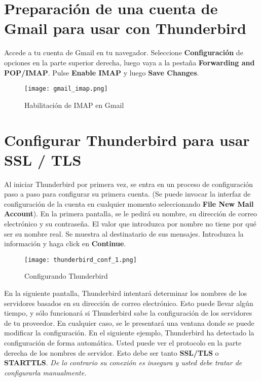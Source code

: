 \documentclass[10pt,a5paper,twoside,,]{book}
\begin{document}
\section{Preparación de una cuenta de Gmail para usar con
Thunderbird}\label{preparaciuxf3n-de-una-cuenta-de-gmail-para-usar-con-thunderbird}

Accede a tu cuenta de Gmail en tu navegador. Seleccione
\textbf{Configuración} de opciones en la parte superior derecha, luego
vaya a la pestaña \textbf{Forwarding and POP/IMAP}. Pulse \textbf{Enable
IMAP} y luego \textbf{Save Changes}.

\begin{figure}[htbp]
\centering
\texttt{[image: gmail\_imap.png]}
\caption{Habilitación de IMAP en Gmail}
\end{figure}

\section{Configurar Thunderbird para usar SSL /
TLS}\label{configurar-thunderbird-para-usar-ssl-tls}

Al iniciar Thunderbird por primera vez, se entra en un proceso de
configuración paso a paso para configurar su primera cuenta. (Se puede
invocar la interfaz de configuración de la cuenta en cualquier momento
seleccionando \textbf{File \textbar{} New \textbar{} Mail Account}). En
la primera pantalla, se le pedirá su nombre, su dirección de correo
electrónico y su contraseña. El valor que introduzca por nombre no tiene
por qué ser su nombre real. Se muestra al destinatario de sus mensajes.
Introduzca la información y haga click en \textbf{Continue}.

\begin{figure}[htbp]
\centering
\texttt{[image: thunderbird\_conf\_1.png]}
\caption{Configurando Thunderbird}
\end{figure}

En la siguiente pantalla, Thunderbird intentará determinar los nombres
de los servidores basados en su dirección de correo electrónico. Esto
puede llevar algún tiempo, y sólo funcionará si Thunderbird sabe la
configuración de los servidores de tu proveedor. En cualquier caso, se
le presentará una ventana donde se puede modificar la configuración. En
el siguiente ejemplo, Thunderbird ha detectado la configuración de forma
automática. Usted puede ver el protocolo en la parte derecha de los
nombres de servidor. Esto debe ser tanto \textbf{SSL/TLS} o
\textbf{STARTTLS}. \emph{De lo contrario su conexión es insegura y usted
debe tratar de configurarla manualmente.}
\end{document}
